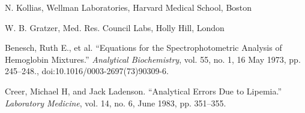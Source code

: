 \documentclass{article}
\begin{document}
\begin{thebibliography}{9}
N. Kollias, Wellman Laboratories, Harvard Medical School, Boston

W. B. Gratzer, Med. Res. Council Labs, Holly Hill, London

Benesch, Ruth E., et al. “Equations for the Spectrophotometric Analysis of Hemoglobin Mixtures.” \textit{Analytical Biochemistry}, vol. 55, no. 1, 16 May 1973, pp. 245–248., doi:10.1016/0003-2697(73)90309-6.

Creer, Michael H, and Jack Ladenson. “Analytical Errors Due to Lipemia.” \textit{Laboratory Medicine}, vol. 14, no. 6, June 1983, pp. 351–355.

\end{thebibliography}
\end{document}
